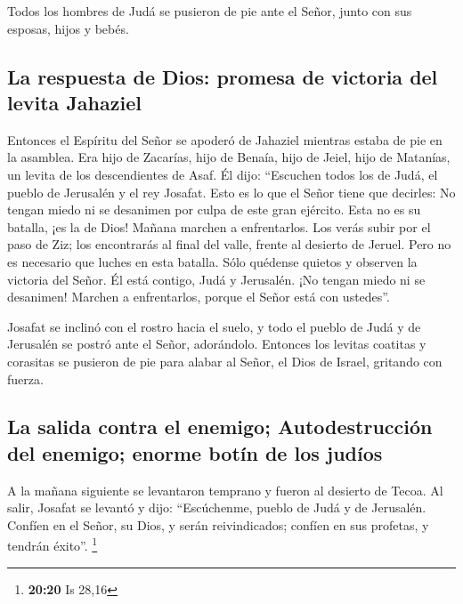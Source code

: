  Todos los hombres de Judá se pusieron de pie ante el
Señor, junto con sus esposas, hijos y bebés.

\hypertarget{la-respuesta-de-dios-promesa-de-victoria-del-levita-jahaziel}{%
\subsection{La respuesta de Dios: promesa de victoria del levita
Jahaziel}\label{la-respuesta-de-dios-promesa-de-victoria-del-levita-jahaziel}}

 Entonces el Espíritu del Señor se apoderó de Jahaziel
mientras estaba de pie en la asamblea. Era hijo de Zacarías, hijo de
Benaía, hijo de Jeiel, hijo de Matanías, un levita de los descendientes
de Asaf.  Él dijo: ``Escuchen todos los de Judá, el
pueblo de Jerusalén y el rey Josafat. Esto es lo que el Señor tiene que
decirles: No tengan miedo ni se desanimen por culpa de este gran
ejército. Esta no es su batalla, ¡es la de Dios!  Mañana
marchen a enfrentarlos. Los verás subir por el paso de Ziz; los
encontrarás al final del valle, frente al desierto de Jeruel.
 Pero no es necesario que luches en esta batalla. Sólo
quédense quietos y observen la victoria del Señor. Él está contigo, Judá
y Jerusalén. ¡No tengan miedo ni se desanimen! Marchen a enfrentarlos,
porque el Señor está con ustedes''.

 Josafat se inclinó con el rostro hacia el suelo, y todo
el pueblo de Judá y de Jerusalén se postró ante el Señor, adorándolo.
 Entonces los levitas coatitas y corasitas se pusieron de
pie para alabar al Señor, el Dios de Israel, gritando con fuerza.

\hypertarget{la-salida-contra-el-enemigo-autodestrucciuxf3n-del-enemigo-enorme-botuxedn-de-los-juduxedos}{%
\subsection{La salida contra el enemigo; Autodestrucción del enemigo;
enorme botín de los
judíos}\label{la-salida-contra-el-enemigo-autodestrucciuxf3n-del-enemigo-enorme-botuxedn-de-los-juduxedos}}

 A la mañana siguiente se levantaron temprano y fueron al
desierto de Tecoa. Al salir, Josafat se levantó y dijo: ``Escúchenme,
pueblo de Judá y de Jerusalén. Confíen en el Señor, su Dios, y serán
reivindicados; confíen en sus profetas, y tendrán éxito''. \footnote{\textbf{20:20}
  Is 28,16}

